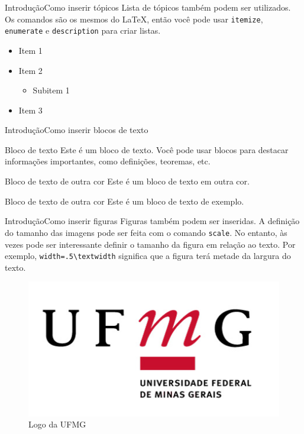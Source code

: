 \documentclass[11pt]{beamer}
\begin{document}
        \begin{frame}{Introdução}{Como inserir tópicos}
            Lista de tópicos também podem ser utilizados. Os comandos são os mesmos
            do LaTeX, então você pode usar \texttt{itemize}, \texttt{enumerate} e
            \texttt{description} para criar listas.
            \begin{itemize}
                \item Item 1
                \item Item 2
                \begin{itemize}
                    \item Subitem 1
                \end{itemize}
                \item Item 3
            \end{itemize}
        \end{frame}

        \begin{frame}{Introdução}{Como inserir blocos de texto}
            \begin{block}{Bloco de texto}
                Este é um bloco de texto. Você pode usar blocos para destacar
                informações importantes, como definições, teoremas, etc.
            \end{block}
            \begin{alertblock}{Bloco de texto de outra cor}
                Este é um bloco de texto em outra cor.
            \end{alertblock}
            \begin{examples}{Bloco de texto de outra cor}
                Este é um bloco de texto de exemplo.
            \end{examples}
        \end{frame}

        \begin{frame}{Introdução}{Como inserir figuras}
            Figuras também podem ser inseridas. A definição do tamanho das imagens
            pode ser feita com o comando \texttt{scale}. No entanto, às vezes
            pode ser interessante definir o tamanho da figura em relação ao texto.
            Por exemplo, \texttt{width=.5\textbackslash textwidth} significa que a
            figura terá metade da largura do texto.
            \begin{figure}
                \centering
                \includegraphics[scale=.4]{./figuras/ufmg}
                \caption{Logo da UFMG}
            \end{figure}
        \end{frame}
\end{document}
